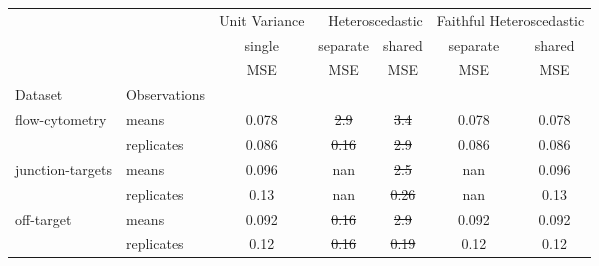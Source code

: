 \begin{tabular}{ll|c|cc|cc}
\toprule
{} & {} & {Unit Variance} & \multicolumn{2}{r}{Heteroscedastic} & \multicolumn{2}{r}{Faithful Heteroscedastic} \\
{} & {} & {single} & {separate} & {shared} & {separate} & {shared} \\
{} & {} & {MSE} & {MSE} & {MSE} & {MSE} & {MSE} \\
{Dataset} & {Observations} & {} & {} & {} & {} & {} \\
\midrule
\multirow[c]{2}{*}{flow-cytometry} & means & 0.078 & \sout{2.9} & \sout{3.4} & 0.078 & 0.078 \\
 & replicates & 0.086 & \sout{0.16} & \sout{2.9} & 0.086 & 0.086 \\
\multirow[c]{2}{*}{junction-targets} & means & 0.096 & nan & \sout{2.5} & nan & 0.096 \\
 & replicates & 0.13 & nan & \sout{0.26} & nan & 0.13 \\
\multirow[c]{2}{*}{off-target} & means & 0.092 & \sout{0.16} & \sout{2.9} & 0.092 & 0.092 \\
 & replicates & 0.12 & \sout{0.16} & \sout{0.19} & 0.12 & 0.12 \\
\bottomrule
\end{tabular}
